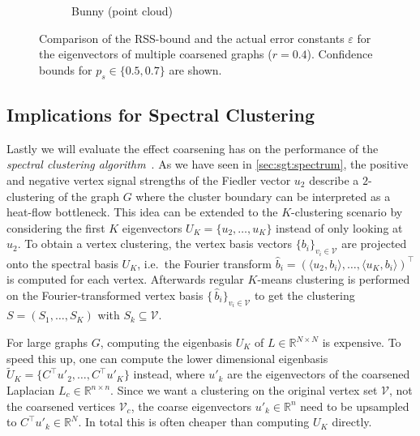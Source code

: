 \begin{figure}[ht]
\begin{subfigure}{0.33\textwidth}
		\caption{Bunny (point cloud)}\label{fig:cons:example:bunny}
	\end{subfigure}
	\caption{%
		Comparison of the RSS-bound and the actual error constants $\varepsilon$ for the eigenvectors of multiple coarsened graphs ($r = 0.4$).
		Confidence bounds for $p_s \in \{0.5, 0.7\}$ are shown.
	}\label{fig:cons:example}
\end{figure}

\vspace{-1em}%
\subsection{Implications for Spectral Clustering}%
\label{sec:cons:sc}

Lastly we will evaluate the effect coarsening has on the performance of the \textit{spectral clustering algorithm}~\cite{Luxburg2007}.
As we have seen in \cref{sec:sgt:spectrum}, the positive and negative vertex signal strengths of the Fiedler vector $u_2$ describe a $2$-clustering of the graph $G$ where the cluster boundary can be interpreted as a heat-flow bottleneck.
This idea can be extended to the $K$-clustering scenario by considering the first $K$ eigenvectors $U_K = \{ u_2, \dots, u_K \}$ instead of only looking at $u_2$.
To obtain a vertex clustering, the vertex basis vectors ${\{ b_i \}}_{v_i \in \mathcal{V}}$ are projected onto the spectral basis $U_K$, i.e.\ the Fourier transform $\widehat{b}_i = {(\langle u_2, b_i \rangle, \dots, \langle u_K, b_i \rangle)}^\top$ is computed for each vertex.
Afterwards regular $K$-means clustering is performed on the Fourier-transformed vertex basis ${\{\,\widehat{b}_i \}}_{v_i \in \mathcal{V}}$ to get the clustering $S = (S_1, \dots, S_K)$ with $S_k \subseteq \mathcal{V}$.

For large graphs $G$, computing the eigenbasis $U_K$ of $L \in \mathbb{R}^{N \times N}$ is expensive.
To speed this up, one can compute the lower dimensional eigenbasis $\widetilde{U}_K = \{ C^\top u'_2, \dots, C^\top u'_K \}$ instead, where $u'_k$ are the eigenvectors of the coarsened Laplacian $L_c \in \mathbb{R}^{n \times n}$.
Since we want a clustering on the original vertex set $\mathcal{V}$, not the coarsened vertices $\mathcal{V}_c$, the coarse eigenvectors $u'_k \in \mathbb{R}^n$ need to be upsampled to $C^\top u'_k \in \mathbb{R}^N$.
In total this is often cheaper than computing $U_K$ directly.


